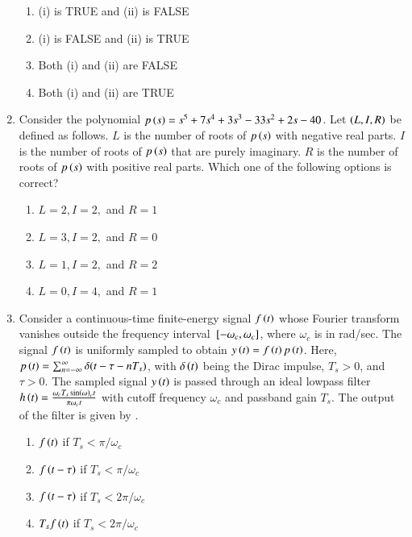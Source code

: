 \documentclass[journal,12pt,onecolumn]{IEEEtran}
\theoremstyle{remark}
\begin{document}
\begin{enumerate}
\hfill{}
\begin{multicols}{2}
\begin{enumerate}
\item (i) is TRUE and (ii) is FALSE
\item (i) is FALSE and (ii) is TRUE
\item Both (i) and (ii) are FALSE
\item Both (i) and (ii) are TRUE
\end{enumerate}    
\end{multicols}


\item Consider the polynomial $p\left(s\right) = s^5 + 7s^4 + 3s^3 - 33s^2 + 2s - 40$. Let $\left(L,I, R\right)$ be defined as follows.
$L$ is the number of roots of $p\left(s\right)$ with negative real parts.
$I$ is the number of roots of $p\left(s\right)$ that are purely imaginary.
$R$ is the number of roots of $p\left(s\right)$ with positive real parts.
Which one of the following options is correct?

\hfill{}
\begin{multicols}{2}
\begin{enumerate}
\item $L = 2, I = 2,$ and $R = 1$
\item $L = 3, I = 2,$ and $R = 0$
\item $L = 1, I = 2,$ and $R = 2$
\item $L = 0, I = 4,$ and $R = 1$
\end{enumerate}    
\end{multicols}


\item Consider a continuous-time finite-energy signal $f\left(t\right)$ whose Fourier transform vanishes outside the frequency interval ${}\left[-\omega_c, \omega_c\right]$, where $\omega_c$ is in rad/sec. The signal $f\left(t\right)$ is uniformly sampled to obtain $y\left(t\right) = f\left(t\right) p\left(t\right)$. Here, $p\left(t\right) = \sum_{n=-\infty}^{\infty} \delta(t - \tau - nT_s)$, with $\delta\left(t\right)$ being the Dirac impulse, $T_s > 0$, and $\tau > 0$. The sampled signal $y\left(t\right)$ is passed through an ideal lowpass filter $h\left(t\right) = \frac{\omega_c T_s \sin\left(\omega\right)_c t}{\pi \omega_c t}$ with cutoff frequency $\omega_c$ and passband gain $T_s$. The output of the filter is given by \underline{\hspace{2cm}}.

\hfill{}

\begin{enumerate}
\item $f\left(t\right)$ if $T_s < \pi/\omega_c$
\item $f\left(t - \tau\right)$ if $T_s < \pi/\omega_c$
\item $f\left(t - \tau\right)$ if $T_s < 2\pi/\omega_c$
\item $T_s f\left(t\right)$ if $T_s < 2\pi/\omega_c$
\end{enumerate}


\end{enumerate}
\end{document}

